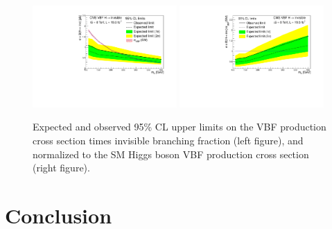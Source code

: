 
\begin{figure}[htp]
\centering
\includegraphics[width=0.49\textwidth]{Chapter05/Images/vbfxslimit.pdf}
\includegraphics[width=0.49\textwidth]{Chapter05/Images/vbflimit.pdf}
\caption{Expected and observed 95\% CL upper limits on the VBF production cross section times invisible branching fraction (left figure), and normalized to the \gls{SM} Higgs boson \gls{VBF} production cross section (right figure). \cite{ARTICLE:CMSVBFHiggsToInvAndZHCombination}}
\label{FIGURE:vbfLimit}
\end{figure}


\section{Conclusion}



% 


